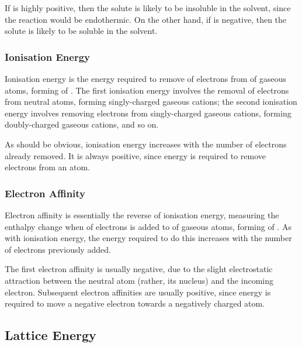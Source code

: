 				If  is highly positive, then the solute is likely to be insoluble in the solvent, since the reaction would be
				endothermic. On the other hand, if  is negative, then the solute is likely to be soluble in the solvent.


			\subsubsection{Ionisation Energy}

				Ionisation energy is the energy required to remove  of electrons from  of gaseous atoms, forming
				 of . The first ionisation energy involves the removal of electrons from neutral atoms,
				forming singly-charged gaseous cations; the second ionisation energy involves removing electrons from singly-charged gaseous
				cations, forming doubly-charged gaseous cations, and so on.

				As should be obvious, ionisation energy increases with the number of electrons already removed. It is always positive,
				since energy is required to remove electrons from an atom.


			\subsubsection{Electron Affinity}

				Electron affinity is essentially the reverse of ionisation energy, measuring the enthalpy change when  of electrons
				is added to  of gaseous atoms, forming  of . As with ionisation energy, the energy
				required to do this increases with the number of electrons previously added.

				The first electron affinity is usually negative, due to the slight electrostatic attraction between the neutral atom (rather, its
				nucleus) and the incoming electron. Subsequent electron affinities are usually positive, since energy is required to move a negative
				electron towards a negatively charged atom.



		\subsection{Lattice Energy}

